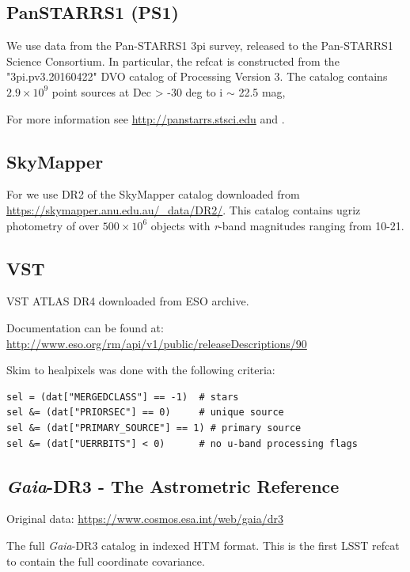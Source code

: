 \subsection{PanSTARRS1 (PS1)}
\label{sec:ps1}

We use data from the Pan-STARRS1 3pi survey, released to the Pan-STARRS1 Science Consortium.
In particular, the refcat is constructed from the "3pi.pv3.20160422" DVO catalog of Processing Version 3.
The catalog contains $2.9 \times 10^9$ point sources at Dec > -30 deg to i $\sim$ 22.5 mag,

For more information see \url{http://panstarrs.stsci.edu} and \citet{2016arXiv161205560C}.

\subsection{SkyMapper}
\label{sec:skymapper}
For \monster we use DR2 of the SkyMapper catalog \citep{2019PASA...36...33O} downloaded from \url{https://skymapper.anu.edu.au/_data/DR2/}. 
This catalog contains ugriz photometry of over $500 \times 10^6$ objects with \textit{r}-band magnitudes ranging from 10-21. 

\subsection{VST}
\label{sec:vst}

VST ATLAS DR4 downloaded from ESO archive.

Documentation can be found at: \url{http://www.eso.org/rm/api/v1/public/releaseDescriptions/90}

Skim to healpixels was done with the following criteria:
\begin{verbatim}
sel = (dat["MERGEDCLASS"] == -1)  # stars
sel &= (dat["PRIORSEC"] == 0)     # unique source 
sel &= (dat["PRIMARY_SOURCE"] == 1) # primary source 
sel &= (dat["UERRBITS"] < 0)      # no u-band processing flags
\end{verbatim}

\subsection{\emph{Gaia}-DR3 - The Astrometric Reference}
\label{sec:gaiadr3}
Original data: \url{https://www.cosmos.esa.int/web/gaia/dr3}

The full \emph{Gaia}-DR3 catalog in indexed HTM format. 
This is the first LSST refcat to contain the full coordinate covariance.

